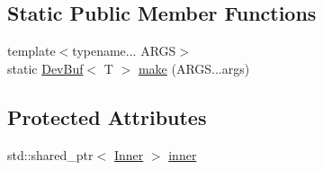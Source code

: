 \subsection*{Static Public Member Functions}
\begin{DoxyCompactItemize}
\item 
{\footnotesize template$<$typename... A\-R\-G\-S$>$ }\\static \hyperlink{classDevBuf}{Dev\-Buf}$<$ T $>$ \hyperlink{classDevBuf_a2b6307effc0f43eb098ae5434b2b0388}{make} (A\-R\-G\-S...\-args)
\end{DoxyCompactItemize}
\subsection*{Protected Attributes}
\begin{DoxyCompactItemize}
\item 
std\-::shared\-\_\-ptr$<$ \hyperlink{structDevBuf_1_1Inner}{Inner} $>$ \hyperlink{classDevBuf_a9cdfde4aee77a264571c4ff6fe6a4c3e}{inner}
\end{DoxyCompactItemize}


